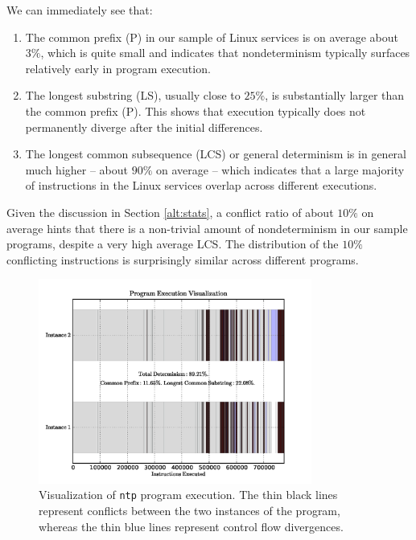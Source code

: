 We can immediately see that:
\begin{enumerate}
\item The common prefix (P) 
in our sample of Linux services is on average about $3\%$,
which is quite small and indicates that nondeterminism 
typically surfaces relatively early in program execution. 

\item The longest substring (LS), usually close to $25\%$,
is substantially larger than the common prefix (P).
This shows that execution typically does not permanently
diverge after the initial differences.

\item The longest common subsequence (LCS) or general determinism
is in general much higher -- about $90\%$ on average -- 
which indicates that a large majority of instructions 
in the Linux services overlap across
different executions. 

\end{enumerate}

Given the discussion in Section \ref{alt:stats}, a conflict ratio
of about $10\%$ on average hints that there is a non-trivial amount of nondeterminism 
in our sample programs, despite a very high average LCS.
The distribution of the $10\%$ conflicting instructions
is surprisingly similar across different programs.

\begin{figure}
  \center
  \includegraphics[trim=0cm 0cm 0cm 0cm, width=0.8\textwidth]{ntp-ch2.png}
  \caption[Visualization of \texttt{ntp} program execution]%
          {Visualization of \texttt{ntp} program execution.
          The thin black lines represent conflicts between
          the two instances of the program, whereas
          the thin blue lines represent control flow
          divergences.}
  \label{ntp:tracech2}
\end{figure} 

